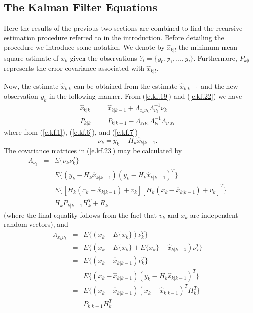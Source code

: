 \subsection{The Kalman Filter Equations}

	Here the results of the previous two sections
are combined to find the recursive estimation procedure
referred to in the introduction.  Before detailing the
procedure we introduce some notation.  We denote by
$\hat{x}_{k|l}$ the minimum mean square estimate of $x_k$
given the observations $Y_l=\{y_0,y_1,\ldots,y_l\}$.  Furthermore,
$P_{k|l}$ represents the error covariance associated with 
$\hat{x}_{k|l}$.

	Now, the estimate $\hat{x}_{k|k}$ can be obtained
from the estimate $\hat{x}_{k|k-1}$ and the new observation $y_k$
in the following manner.  From (\ref{e.kf.19}) and (\ref{e.kf.22})
we have
%
\begin{eqnarray}
\hat{x}_{k|k}&=&\hat{x}_{k|k-1}+\Lambda_{x_k\nu_k}\Lambda_{\nu_k}^{-1}\nu_k\nonumber\\
P_{k|k}&=&P_{k|k-1}-\Lambda_{x_k\nu_k}\Lambda_{\nu_k}^{-1}\Lambda_{\nu_k x_k}
\label{e.kf.23}
\end{eqnarray}
%
where from (\ref{e.kf.1}), (\ref{e.kf.6}), and (\ref{e.kf.7})
%
\begin{equation}
\nu_k=y_k-H_k\hat{x}_{k|k-1}.
\label{e.kf.24}
\end{equation}
%
The covariance
matrices in (\ref{e.kf.23}) may be calculated by
%
\begin{eqnarray}
\Lambda_{\nu_k}&=&E\{\nu_k\nu_k^T\}\nonumber\\
               &=&E\{(y_k-H_k\hat{x}_{k|k-1})(y_k-H_k\hat{x}_{k|k-1})^T\}\nonumber\\
               &=&E\{[H_k(x_k-\hat{x}_{k|k-1})+v_k][H_k(x_k-\hat{x}_{k|k-1})+v_k]^T\}\nonumber\\
               &=&H_kP_{k|k-1}H_k^T+R_k
\label{e.kf.25}
\end{eqnarray}
%
(where the final equality follows from the fact that $v_k$ and
$x_k$ are independent random vectors), and
%
\begin{eqnarray}
\Lambda_{x_k\nu_k}&=&E\{(x_k-E\{x_k\})\nu_k^T\}\nonumber\\
               &=&E\{(x_k-E\{x_k\}+E\{x_k\}-\hat{x}_{k|k-1})\nu_k^T\}\nonumber\\
               &=&E\{(x_k-\hat{x}_{k|k-1})\nu_k^T\}\nonumber\\
               &=&E\{(x_k-\hat{x}_{k|k-1})(y_k-H_k\hat{x}_{k|k-1})^T\}\nonumber\\
               &=&E\{(x_k-\hat{x}_{k|k-1})(x_k-\hat{x}_{k|k-1})^TH_k^T\}\nonumber\\
               &=&P_{k|k-1}H_k^T
\label{e.kf.26}
\end{eqnarray}
